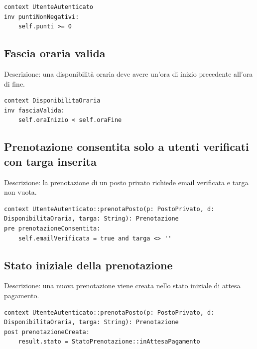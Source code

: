 \documentclass[12pt,a4paper]{article}
\begin{document}
\begin{verbatim}
context UtenteAutenticato
inv puntiNonNegativi:
    self.punti >= 0
\end{verbatim}

\subsection{Fascia oraria valida}
Descrizione: una disponibilità oraria deve avere un’ora di inizio precedente all’ora di fine.

\begin{verbatim}
context DisponibilitaOraria
inv fasciaValida:
    self.oraInizio < self.oraFine
\end{verbatim}

\subsection{Prenotazione consentita solo a utenti verificati con targa inserita}
Descrizione: la prenotazione di un posto privato richiede email verificata e targa non vuota.

\begin{verbatim}
context UtenteAutenticato::prenotaPosto(p: PostoPrivato, d: DisponibilitaOraria, targa: String): Prenotazione
pre prenotazioneConsentita:
    self.emailVerificata = true and targa <> ''
\end{verbatim}

\subsection{Stato iniziale della prenotazione}
Descrizione: una nuova prenotazione viene creata nello stato iniziale di attesa pagamento.

\begin{verbatim}
context UtenteAutenticato::prenotaPosto(p: PostoPrivato, d: DisponibilitaOraria, targa: String): Prenotazione
post prenotazioneCreata:
    result.stato = StatoPrenotazione::inAttesaPagamento
\end{verbatim}
\end{document}

